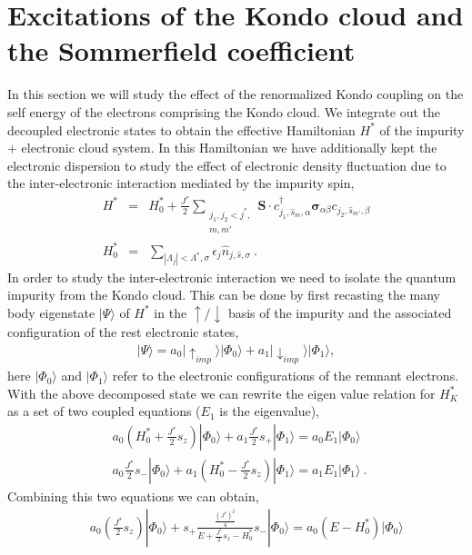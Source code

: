 \documentclass[aps,prb,preprint,groupedaddress]{revtex4-2}
\begin{document}
\section{Excitations of the Kondo cloud and the Sommerfield coefficient}\label{susc2}
In this section we will study the effect of the renormalized Kondo coupling on the self energy of the electrons comprising the Kondo cloud. We integrate out the decoupled electronic states to obtain the effective Hamiltonian $H^{*}$ of the impurity + electronic cloud system. In this Hamiltonian we have additionally kept the electronic dispersion to study the effect of electronic density fluctuation due to the inter-electronic interaction mediated by the impurity spin, 
\begin{eqnarray}
H^{*}&=&H_{0}^{*}+\frac{J^{*}}{2}\sum_{\substack{j_{1},j_{2}<j^{*},\\ m,m'}}\mathbf{S}\cdot c^{\dagger}_{j_{1},\hat{s}_{m},\alpha}\boldsymbol{\sigma}_{\alpha\beta}c_{j_{2},\hat{s}_{m'},\beta}\label{effHam}\\
H_{0}^{*}&=&\sum_{|\Lambda_{j}|<\Lambda^{*},\sigma}\epsilon_{j}\hat{n}_{j,\hat{s},\sigma}\label{density}~.
\end{eqnarray}
In order to study the inter-electronic interaction we need to isolate the quantum impurity from the Kondo cloud. This can be done by first recasting the many body eigenstate $|\Psi\rangle$ of $H^{*}$ in the $\uparrow/\downarrow$ basis of the impurity and the associated configuration of the rest electronic states, 
\begin{eqnarray}
|\Psi\rangle = a_{0}|\uparrow_{imp}\rangle|\Phi_{0}\rangle+a_{1}|\downarrow_{imp}\rangle|\Phi_{1}\rangle,\label{decompState}
\end{eqnarray}
here $|\Phi_{0}\rangle$ and $|\Phi_{1}\rangle$ refer to the electronic configurations of the remnant electrons. With the above decomposed state we can rewrite the eigen value relation for $H^{*}_{K}$ as a set of two coupled equations ($E_{1}$ is the eigenvalue),
\begin{eqnarray}
&&a_{0}(H_{0}^{*}+\frac{J^{*}}{2}s_{z})|\Phi_{0}\rangle + a_{1}\frac{J^{*}}{2}s_{+}|\Phi_{1}\rangle = a_{0}E_{1}|\Phi_{0}\rangle\nonumber\\
&&a_{0}\frac{J^{*}}{2}s_{-}|\Phi_{0}\rangle +a_{1}(H_{0}^{*}-\frac{J^{*}}{2}s_{z})|\Phi_{1}\rangle  = a_{1}E_{1}|\Phi_{1}\rangle~.~~~~~
\end{eqnarray}
Combining this two equations we can obtain,
\begin{eqnarray}
&&a_{0}(\frac{J^{*}}{2}s_{z})|\Phi_{0}\rangle + s_{+}\frac{\frac{(J^{*})^{2}}{4}}{E+\frac{J^{*}}{2}s_{z}-H_{0}^{*}}s_{-}|\Phi_{0}\rangle = a_{0}(E-H^{*}_{0})|\Phi_{0}\rangle\label{coupled1}
\end{eqnarray}
\end{document}
